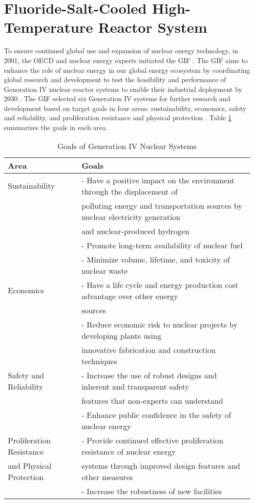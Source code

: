 \section{Fluoride-Salt-Cooled High-Temperature Reactor System}
\label{sec:fhr}
To ensure continued global use and expansion of nuclear energy technology, in 
2001, the \gls{OECD} and nuclear energy experts initiated the \gls{GIF} 
\cite{gen_iv_international_forum_technology_2014}.
The \gls{GIF} aims to enhance the role of nuclear energy in our global energy 
ecosystem by coordinating global research and development to test the 
feasibility and performance of Generation IV nuclear reactor systems to enable 
their industrial deployment by 2030 \cite{gen_iv_international_forum_technology_2014}.
The \gls{GIF} selected six Generation IV systems for further research and 
development based on target goals in four areas: sustainability, 
economics, safety and reliability, and proliferation resistance and physical 
protection \cite{gen_iv_international_forum_technology_2014}. 
Table \ref{tab:goals-gen4} summarizes the goals in each area. 
\begin{table}[htb!]
    \centering
    \onehalfspacing
    \caption{Goals of Generation IV Nuclear Systems \cite{gen_iv_international_forum_technology_2014,
    gen_iv_international_forum_technology_2014}}
	\label{tab:goals-gen4}
    \footnotesize
    \begin{tabular}{l|l}
    \hline
                               \textbf{Area} & \textbf{Goals} \\ \hline
    Sustainability   & - Have a positive impact on the environment through the displacement of \\
    & polluting energy and transportation sources by nuclear electricity generation \\
    & and nuclear-produced hydrogen \\ 
    & - Promote long-term availability of nuclear fuel \\
    & - Minimize volume, lifetime, and toxicity of nuclear waste \\ \hline
    Economics & - Have a life cycle and energy production cost advantage over other energy \\
    & sources \\ 
    & - Reduce economic risk to nuclear projects by developing plants using \\
    & innovative fabrication and construction techniques \\ \hline
    Safety and Reliability   & - Increase the use of robust designs and inherent and transparent safety\\
    & features that non-experts can understand \\ 
    & - Enhance public confidence in the safety of nuclear energy \\\hline
    Proliferation Resistance & - Provide continued effective proliferation resistance of nuclear energy \\
    and Physical Protection & systems through improved design features and other measures \\ 
    & - Increase the robustness of new facilities \\ \hline
    \end{tabular}
\end{table}
